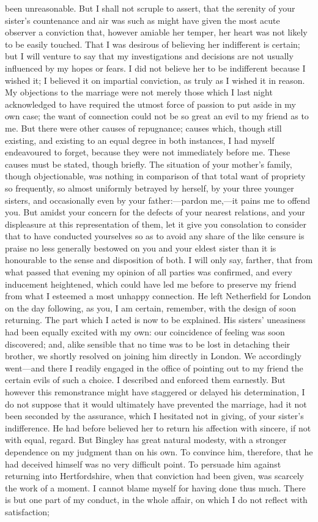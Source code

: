 \documentclass[12pt]{book}
\begin{document}
been unreasonable. But I shall not scruple to assert, that the serenity of your sister's countenance and air was such as might have given the most acute observer a conviction that, however amiable her temper, her heart was not likely to be easily touched. That I was desirous of believing her indifferent is certain; but I will venture to say that my investigations and decisions are not usually influenced by my hopes or fears. I did not believe her to be indifferent because I wished it; I believed it on impartial conviction, as truly as I wished it in reason. My objections to the marriage were not merely those which I last night acknowledged to have required the utmost force of passion to put aside in my own case; the want of connection could not be so great an evil to my friend as to me. But there were other causes of repugnance; causes which, though still existing, and existing to an equal degree in both instances, I had myself endeavoured to forget, because they were not immediately before me. These causes must be stated, though briefly. The situation of your mother's family, though objectionable, was nothing in comparison of that total want of propriety so frequently, so almost uniformly betrayed by herself, by your three younger sisters, and occasionally even by your father:---pardon me,---it pains me to offend you. But amidst your concern for the defects of your nearest relations, and your displeasure at this representation of them, let it give you consolation to consider that to have conducted yourselves so as to avoid any share of the like censure is praise no less generally bestowed on you and your eldest sister than it is honourable to the sense and disposition of both. I will only say, farther, that from what passed that evening my opinion of all parties was confirmed, and every inducement heightened, which could have led me before to preserve my friend from what I esteemed a most unhappy connection. He left Netherfield for London on the day following, as you, I am certain, remember, with the design of soon returning. The part which I acted is now to be explained. His sisters' uneasiness had been equally excited with my own: our coincidence of feeling was soon discovered; and, alike sensible that no time was to be lost in detaching their brother, we shortly resolved on joining him directly in London. We accordingly went---and there I readily engaged in the office of pointing out to my friend the certain evils of such a choice. I described and enforced them earnestly. But however this remonstrance might have staggered or delayed his determination, I do not suppose that it would ultimately have prevented the marriage, had it not been seconded by the assurance, which I hesitated not in giving, of your sister's indifference. He had before believed her to return his affection with sincere, if not with equal, regard. But Bingley has great natural modesty, with a stronger dependence on my judgment than on his own. To convince him, therefore, that he had deceived himself was no very difficult point. To persuade him against returning into Hertfordshire, when that conviction had been given, was scarcely the work of a moment. I cannot blame myself for having done thus much. There is but one part of my conduct, in the whole affair, on which I do not reflect with satisfaction; 
\end{document}
